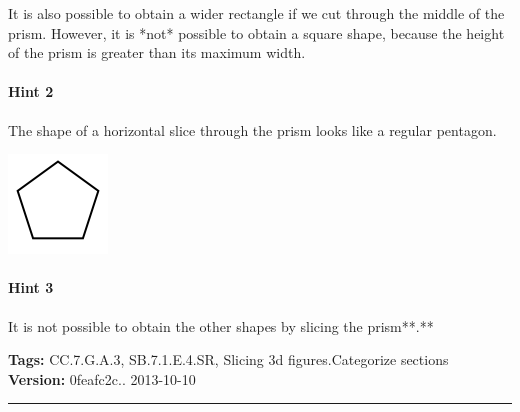 \documentclass[twocolumn,10pt]{article}
\def\shrinkfactor{0.4}
\begin{document}
It is also possible to obtain a wider rectangle if we cut through the middle of the prism. However, it is *not* possible to obtain a square shape, because the height of the prism is greater than its maximum width.

\paragraph{Hint 2}The shape of a horizontal slice through the prism looks like a regular pentagon.  

\includegraphics[scale=\shrinkfactor]{figures/498a6b09730fdba2360826c138eeee142e8cccc1.png}

\paragraph{Hint 3}It is not possible to obtain the other shapes by slicing the prism**.**



\medskip
\noindent
\textbf{Tags:} {\footnotesize CC.7.G.A.3, SB.7.1.E.4.SR, Slicing 3d figures.Categorize sections}\\
\textbf{Version:} 0feafc2c.. 2013-10-10
\smallskip\hrule
\end{document}
